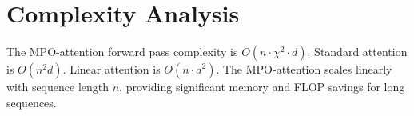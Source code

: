\documentclass{article}
\begin{document}
\section{Complexity Analysis}
The MPO-attention forward pass complexity is $O(n \cdot \chi^2 \cdot d)$. Standard attention is $O(n^2 d)$. Linear attention is $O(n \cdot d^2)$.
The MPO-attention scales linearly with sequence length $n$, providing significant memory and FLOP savings for long sequences.
\end{document}

